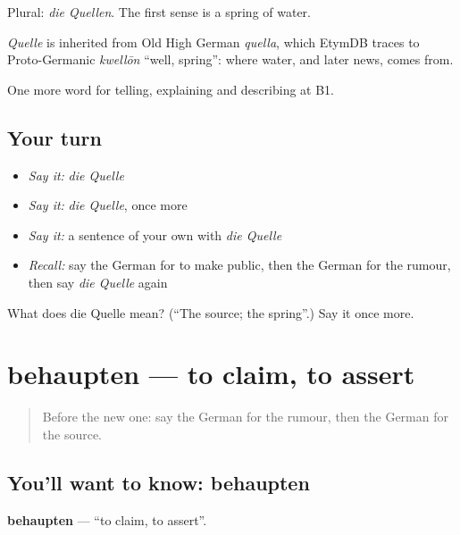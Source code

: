 Plural: \emph{die Quellen}. The first sense is a spring of water.

\begin{cousinweb}
\emph{Quelle} is inherited from Old High German \emph{quella}, which EtymDB traces to Proto-Germanic \emph{kwellōn} \textquotedblleft{}well, spring\textquotedblright{}: where water, and later news, comes from.
\end{cousinweb}

\begin{grammarlens}[title={What you've built}]
One more word for telling, explaining and describing at B1.
\end{grammarlens}

\subsection*{Your turn}
\begin{itemize}
\raggedright
  \item \emph{Say it:} \emph{die Quelle}
  \item \emph{Say it:} \emph{die Quelle}, once more
  \item \emph{Say it:} a sentence of your own with \emph{die Quelle}
  \item \emph{Recall:} say the German for to make public, then the German for the rumour, then say \emph{die Quelle} again
\end{itemize}

\begin{tcolorbox}[breakable,colback=teal!4,colframe=teal!35!black,title={Before you move on}]
What does die Quelle mean? (\textquotedblleft{}The source; the spring\textquotedblright{}.) Say it once more.
\end{tcolorbox}
\section[behaupten]{behaupten — to claim, to assert}

\label{lesson:GE-C274-behaupten}



\begin{quote}
Before the new one: say the German for the rumour, then the German for the source.
\end{quote}

\subsection*{You'll want to know: behaupten}
\textbf{behaupten} — \textquotedblleft{}to claim, to assert\textquotedblright{}.

